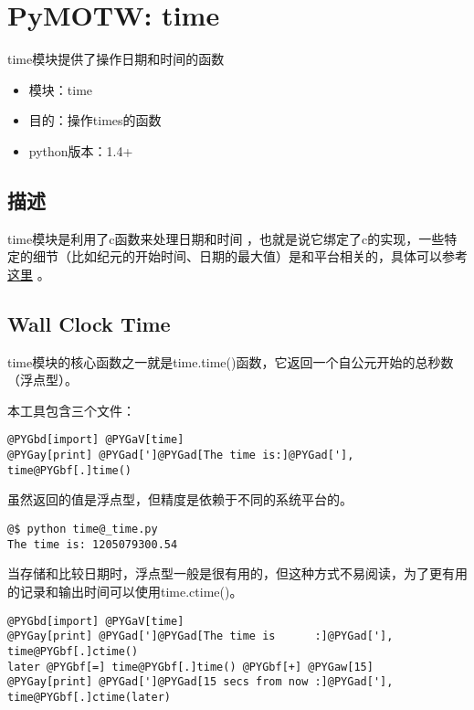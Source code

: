 \documentclass[letterpaper,10pt,english]{manual}
\begin{document}
\resetcurrentobjects


\section{PyMOTW: time}

time模块提供了操作日期和时间的函数
\begin{itemize}
\item {} 
模块：time

\item {} 
目的：操作times的函数

\item {} 
python版本：1.4+

\end{itemize}


\subsection{描述}

time模块是利用了c函数来处理日期和时间 ，也就是说它绑定了c的实现，一些特定的细节（比如纪元的开始时间、日期的最大值）是和平台相关的，具体可以参考 \href{http://docs.python.org/lib/module-time.html}{这里} 。


\subsection{Wall Clock Time}

time模块的核心函数之一就是time.time()函数，它返回一个自公元开始的总秒数（浮点型）。

本工具包含三个文件：

\begin{Verbatim}[commandchars=@\[\]]
@PYGbd[import] @PYGaV[time]
@PYGay[print] @PYGad[']@PYGad[The time is:]@PYGad['], time@PYGbf[.]time()
\end{Verbatim}

虽然返回的值是浮点型，但精度是依赖于不同的系统平台的。

\begin{Verbatim}[commandchars=@\[\]]
@$ python time@_time.py
The time is: 1205079300.54
\end{Verbatim}

当存储和比较日期时，浮点型一般是很有用的，但这种方式不易阅读，为了更有用的记录和输出时间可以使用time.ctime()。

\begin{Verbatim}[commandchars=@\[\]]
@PYGbd[import] @PYGaV[time]
@PYGay[print] @PYGad[']@PYGad[The time is      :]@PYGad['], time@PYGbf[.]ctime()
later @PYGbf[=] time@PYGbf[.]time() @PYGbf[+] @PYGaw[15]
@PYGay[print] @PYGad[']@PYGad[15 secs from now :]@PYGad['], time@PYGbf[.]ctime(later)
\end{Verbatim}
\end{document}
